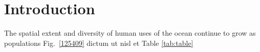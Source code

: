 \section{Introduction}
\label{introduction}

The spatial extent and diversity of human uses of the ocean continue to grow as populations  Fig.~\ref{125409} dictum ut nisl et Table \ref{tab:table}
